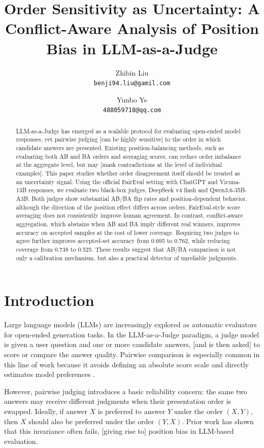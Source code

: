 \documentclass[11pt]{article}
\title{Order Sensitivity as Uncertainty: A Conflict-Aware Analysis of Position Bias in LLM-as-a-Judge}
\author{Zhibin Liu\\ \texttt{benji94.liu@gamil.com} \and Yunbo Ye\\ \texttt{488059718@qq.com}}
\date{}
\begin{document}
\maketitle

\begin{abstract}
LLM-as-a-Judge has emerged as a scalable protocol for evaluating open-ended model responses, yet pairwise judging [can be highly sensitive] to the order in which candidate answers are presented. Existing position-balancing methods, such as evaluating both AB and BA orders and averaging scores, can reduce order imbalance at the aggregate level, but may [mask contradictions at the level of individual examples]. This paper studies whether order disagreement itself should be treated as an uncertainty signal. Using the official FairEval setting with ChatGPT and Vicuna-13B responses, we evaluate two black-box judges, DeepSeek v4 flash and Qwen3.6-35B-A3B. Both judges show substantial AB/BA flip rates and position-dependent behavior, although the direction of the position effect differs across orders. FairEval-style score averaging does not consistently improve human agreement. In contrast, conflict-aware aggregation, which abstains when AB and BA imply different real winners, improves accuracy on accepted samples at the cost of lower coverage. Requiring two judges to agree further improves accepted-set accuracy from 0.695 to 0.762, while reducing coverage from 0.738 to 0.525. These results suggest that AB/BA comparison is not only a calibration mechanism, but also a practical detector of unreliable judgments.
\end{abstract}

\section{Introduction}

Large language models (LLMs) are increasingly explored as automatic evaluators for open-ended generation tasks. In the LLM-as-a-Judge paradigm, a judge model is given a user question and one or more candidate answers, [and is then asked] to score or compare the answer quality. Pairwise comparison is especially common in this line of work because it avoids defining an absolute score scale and directly estimates model preferences \cite{zheng2023judging,liu2023geval}.

However, pairwise judging introduces a basic reliability concern: the same two answers may receive different judgments when their presentation order is swapped. Ideally, if answer $X$ is preferred to answer $Y$ under the order $(X,Y)$, then $X$ should also be preferred under the order $(Y,X)$. Prior work has shown that this invariance often fails, [giving rise to] position bias in LLM-based evaluation.
\end{document}
